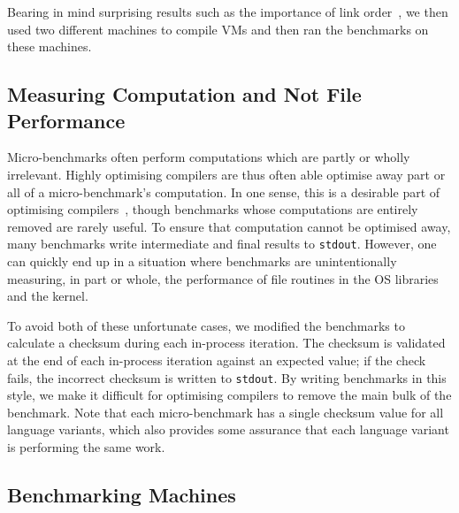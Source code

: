 \documentclass[a4paper,UKenglish]{lipics}
\begin{document}
Bearing in mind surprising
results such as the importance of link order~\cite{mytkowicz09surprising}, we
then used two different machines to compile VMs and then ran the benchmarks
on these machines.


\subsection{Measuring Computation and Not File Performance}

Micro-benchmarks often perform computations which are partly or wholly irrelevant. Highly
optimising compilers are thus often able optimise away part or all of a
micro-benchmark's computation. In one sense, this is a desirable part of
optimising compilers~\cite{seaton15phd}, though benchmarks whose computations
are entirely removed are rarely useful. To ensure that computation cannot
be optimised away, many benchmarks write intermediate and final results
to \texttt{stdout}. However, one can quickly end up in a situation where benchmarks are
unintentionally measuring, in part or whole, the performance of file routines in
the OS libraries and the kernel.

To avoid both of these unfortunate cases,
we modified the benchmarks to calculate a checksum during each in-process iteration.
The checksum is validated at the end of each in-process iteration against an expected
value; if the check fails, the incorrect checksum is written to \texttt{stdout}.
By writing benchmarks in
this style, we make it difficult for optimising compilers to remove the
main bulk of the benchmark. Note that each micro-benchmark has a single checksum value for all
language variants, which also provides some assurance that each language variant is
performing the same work.


\subsection{Benchmarking Machines}
\end{document}
